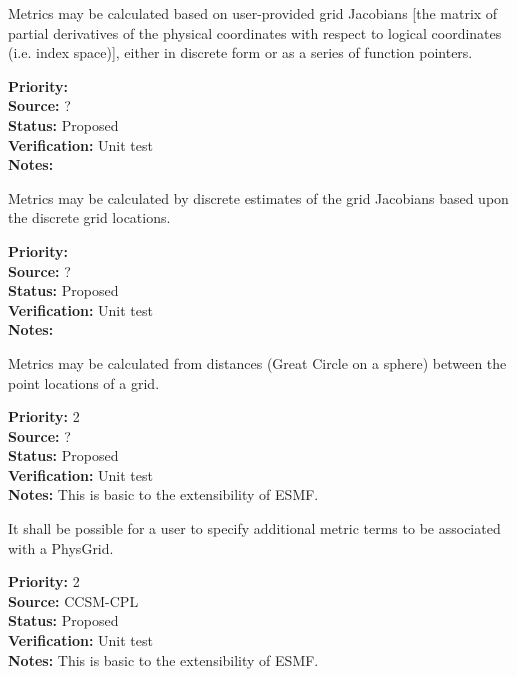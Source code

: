 Metrics may be calculated based on user-provided grid Jacobians [the matrix of
partial derivatives of the physical coordinates with respect to logical
coordinates (i.e. index space)], either in discrete form or as a series of function pointers.
\begin{reqlist}
{\bf Priority:}  \\
{\bf Source:} ? \\
{\bf Status:} Proposed \\
{\bf Verification:} Unit test \\
{\bf Notes:} 
\end{reqlist}

Metrics may be calculated by discrete estimates of the grid Jacobians based upon
the discrete grid locations.
\begin{reqlist}
{\bf Priority:}  \\
{\bf Source:} ? \\
{\bf Status:} Proposed \\
{\bf Verification:} Unit test \\
{\bf Notes:}
\end{reqlist}

Metrics may be calculated from distances (Great Circle on a sphere) between
the point locations of a grid.
\begin{reqlist}
{\bf Priority:} 2 \\
{\bf Source:} ? \\
{\bf Status:} Proposed \\
{\bf Verification:} Unit test \\
{\bf Notes:} This is basic to the extensibility of ESMF. 
\end{reqlist}

It shall be possible for a user to specify additional metric terms to be associated
with a PhysGrid.
\begin{reqlist}
{\bf Priority:} 2 \\
{\bf Source:} CCSM-CPL \\
{\bf Status:} Proposed \\
{\bf Verification:} Unit test \\
{\bf Notes:} This is basic to the extensibility of ESMF. 
\end{reqlist}



